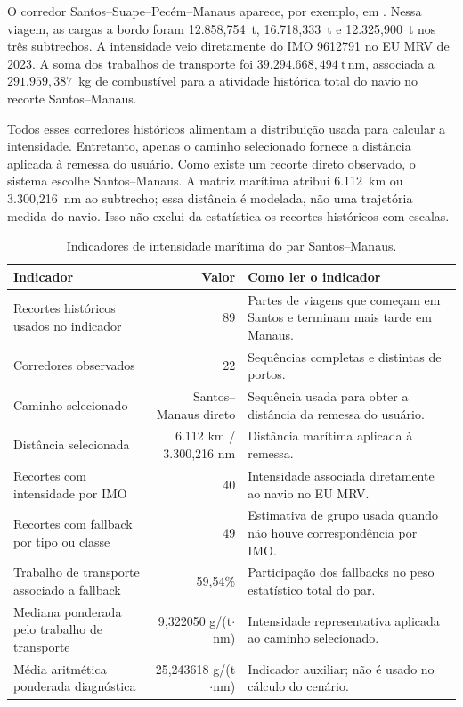 O corredor Santos--Suape--Pecém--Manaus aparece, por exemplo, em . Nessa viagem, as cargas a bordo foram 12.858,754~t, 16.718,333~t e 12.325,900~t nos três subtrechos. A intensidade veio diretamente do IMO 9612791 no EU MRV de 2023. A soma dos trabalhos de transporte foi \(39.294.668{,}494~\mathrm{t\,nm}\), associada a \(291.959{,}387\)~kg de combustível para a atividade histórica total do navio no recorte Santos--Manaus.

Todos esses corredores históricos alimentam a distribuição usada para calcular a intensidade. Entretanto, apenas o caminho selecionado fornece a distância aplicada à remessa do usuário. Como existe um recorte direto observado, o sistema escolhe Santos--Manaus. A matriz marítima atribui 6.112~km ou 3.300,216~nm ao subtrecho; essa distância é modelada, não uma trajetória medida do navio. Isso não exclui da estatística os recortes históricos com escalas.

\begin{table}[htbp]
\centering
\small
\caption{Indicadores de intensidade marítima do par Santos--Manaus.}
\label{tab:santos-manaus-intensidade}
\begin{tabularx}{\textwidth}{L{0.44\textwidth}r Y}
\toprule
Indicador & Valor & Como ler o indicador \\
\midrule
Recortes históricos usados no indicador & 89 & Partes de viagens que começam em Santos e terminam mais tarde em Manaus.\\
Corredores observados & 22 & Sequências completas e distintas de portos.\\
Caminho selecionado & Santos--Manaus direto & Sequência usada para obter a distância da remessa do usuário.\\
Distância selecionada & 6.112 km / 3.300,216 nm & Distância marítima aplicada à remessa.\\
Recortes com intensidade por IMO & 40 & Intensidade associada diretamente ao navio no EU MRV.\\
Recortes com fallback por tipo ou classe & 49 & Estimativa de grupo usada quando não houve correspondência por IMO.\\
Trabalho de transporte associado a fallback & 59,54\% & Participação dos fallbacks no peso estatístico total do par.\\
Mediana ponderada pelo trabalho de transporte & 9,322050 g/(t$\cdot$nm) & Intensidade representativa aplicada ao caminho selecionado.\\
Média aritmética ponderada diagnóstica & 25,243618 g/(t$\cdot$nm) & Indicador auxiliar; não é usado no cálculo do cenário.\\
\bottomrule
\end{tabularx}
\end{table}

